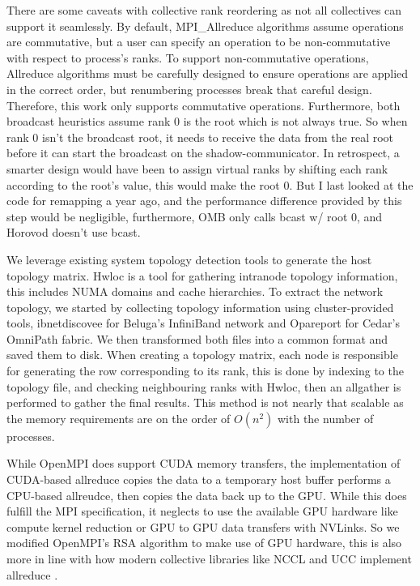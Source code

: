 There are some caveats with collective rank reordering as not all collectives can support it seamlessly.
By default, MPI\_Allreduce algorithms assume operations are commutative, but a user can specify an operation to be non-commutative with respect to process's ranks. 
To support non-commutative operations, Allreduce algorithms must be carefully designed to ensure operations are applied in the correct order, but renumbering processes break that careful design.
Therefore, this work only supports commutative operations.
Furthermore, both broadcast heuristics assume rank 0 is the root which is not always true. 
So when rank 0 isn't the broadcast root, it needs to receive the data from the real root before it can start the broadcast on the shadow-communicator.
In retrospect, a smarter design would have been to assign virtual ranks by shifting each rank according to the root's value, this would make the root 0.
But I last looked at the code for remapping a year ago, and the performance difference provided by this step would be negligible, furthermore, OMB only calls bcast w/ root 0, and Horovod doesn't use bcast.

We leverage existing system topology detection tools to generate the host topology matrix.
Hwloc \cite{Broquedis2010hwloc} is a tool for gathering intranode topology information, this includes NUMA domains and cache hierarchies.
To extract the network topology, we started by collecting topology information using cluster-provided tools, ibnetdiscovee for Beluga's InfiniBand network and Opareport for Cedar's OmniPath fabric.
We then transformed both files into a common format and saved them to disk.
When creating a topology matrix, each node is responsible for generating the row corresponding to its rank, this is done by indexing to the topology file, and checking neighbouring ranks with Hwloc, then an allgather is performed to gather the final results.
This method is not nearly that scalable as the memory requirements are on the order of $O(n^2)$ with the number of processes.

While OpenMPI does support CUDA memory transfers, the implementation of CUDA-based allreduce copies the data to a temporary host buffer performs a CPU-based allreudce, then copies the data back up to the GPU.
While this does fulfill the MPI specification, it neglects to use the available GPU hardware like compute kernel reduction or GPU to GPU data transfers with NVLinks.
So we modified OpenMPI's RSA algorithm to make use of GPU hardware, this is also more in line with how modern collective libraries like NCCL and UCC implement allreduce \cite{UCC, NCCL}.


